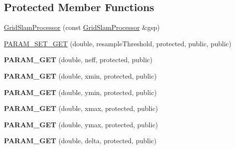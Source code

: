 \subsection*{Protected Member Functions}
\begin{DoxyCompactItemize}
\item 
\hyperlink{classGMapping_1_1GridSlamProcessor_a7800b02d50b6b5d7c8b226e3c361ca2c}{Grid\+Slam\+Processor} (const \hyperlink{classGMapping_1_1GridSlamProcessor}{Grid\+Slam\+Processor} \&gsp)
\item 
\hyperlink{classGMapping_1_1GridSlamProcessor_a9669d7233fda1a872ee2e7bfd58422f6}{P\+A\+R\+A\+M\+\_\+\+S\+E\+T\+\_\+\+G\+ET} (double, resample\+Threshold, protected, public, public)
\item 
\mbox{\label{classGMapping_1_1GridSlamProcessor_aafaee08750396914c0359cd533a3a32e}} 
{\bfseries P\+A\+R\+A\+M\+\_\+\+G\+ET} (double, neff, protected, public)
\item 
\mbox{\label{classGMapping_1_1GridSlamProcessor_a5b55357e7c755d1814641bd9277ff67f}} 
{\bfseries P\+A\+R\+A\+M\+\_\+\+G\+ET} (double, xmin, protected, public)
\item 
\mbox{\label{classGMapping_1_1GridSlamProcessor_a225d3c8e74e1a533a49a18664939f9a1}} 
{\bfseries P\+A\+R\+A\+M\+\_\+\+G\+ET} (double, ymin, protected, public)
\item 
\mbox{\label{classGMapping_1_1GridSlamProcessor_a9705463bbdbfc1adfaadc9d63de57037}} 
{\bfseries P\+A\+R\+A\+M\+\_\+\+G\+ET} (double, xmax, protected, public)
\item 
\mbox{\label{classGMapping_1_1GridSlamProcessor_aa42c6dbd72076e79f858d096e8fa5645}} 
{\bfseries P\+A\+R\+A\+M\+\_\+\+G\+ET} (double, ymax, protected, public)
\item 
\mbox{\label{classGMapping_1_1GridSlamProcessor_a24de55fb12548d080071138c087eb275}} 
{\bfseries P\+A\+R\+A\+M\+\_\+\+G\+ET} (double, delta, protected, public)
\item 
\mbox{\label{classGMapping_1_1GridSlamProcessor_a83cecf60f47fc3c3f3142e67fd80e59d}} 

\end{DoxyCompactItemize}
